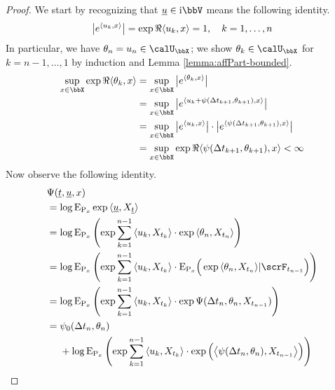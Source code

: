 \begin{proof}
  \label{proof:proposition:aff-fdds-complex}
  We start by recognizing that $\underline\momentVar \in \im\vecSpace$ means the following identity.
  \begin{equation*}
    \big| e^{\langle u_k , x \rangle} \big| = \exp\Re{\langle u_k , x\rangle} = 1, \quad k = 1, \ldots, n
  \end{equation*}
  In particular, we have $\twistVar_n = \momentVar_n \in \boundedSpace$; we show $\twistVar_k \in \boundedSpace$ for $k = n-1,\ldots, 1$ by induction and Lemma \ref{lemma:affPart-bounded}.
  \begin{align*}
    \sup_{\stateVar\in\stateSpace}\exp\Re\prj{\twistVar_k}{\stateVar} 
    &= \sup_{\stateVar\in\stateSpace}\big| e^\prj{\twistVar_k}{\stateVar} \big|  \\
    &= \sup_{\stateVar\in\stateSpace}\big| e^\prj{\momentVar_k + \affPart(\Delta t_{k+1}, \twistVar_{k+1})}{\stateVar} \big| \\
    &= \sup_{\stateVar\in\stateSpace}\big| e^\prj{\momentVar_k}{\stateVar} \big| \cdot \big| e^\prj{\affPart(\Delta t_{k+1}, \twistVar_{k+1})}{\stateVar} \big| \\
    &= \sup_{\stateVar\in\stateSpace} \exp\Re\prj{\affPart(\Delta t_{k+1}, \twistVar_{k+1})}{\stateVar} < \infty
  \end{align*}
  Now observe the following identity.
  \begin{align}
    \notag
    &\aff(\underline t, \underline\momentVar, \stateVar) \\
    \notag
    &=\log\Exp_{\Prb_\stateVar} \exp\prj{\underline\momentVar}{\X_{\underline t}} \\
    \label{eq:complex-tower-start}
    &= \log\Exp_{\Prb_\stateVar}\left( \exp\sum_{k=1}^{n-1} \prj{\momentVar_k}{\X_{t_k}} \cdot \exp\prj{\twistVar_n}{\X_{t_n}} \right) \\
    \notag
    &= \log\Exp_{\Prb_\stateVar}\left( \exp\sum_{k=1}^{n-1} \prj{\momentVar_k}{\X_{t_k}} \cdot \Exp_{\Prb_\stateVar}\Big(\exp\prj{\twistVar_n}{\X_{t_n}} |\scrF_{t_{n-1}} \Big) \right) \\
    \notag
    &= \log\Exp_{\Prb_\stateVar}\left( \exp\sum_{k=1}^{n-1} \prj{\momentVar_k}{\X_{t_k}} \cdot \exp\aff(\Delta t_n, \twistVar_n, \X_{t_{n-1}})\right) \\
    \notag
    &= \begin{aligned}[t]
      &\affPart_0(\Delta t_n, \twistVar_n) \\
      &+ \log\Exp_{\Prb_\stateVar}\left( \exp\sum_{k=1}^{n-1} \prj{\momentVar_k}{\X_{t_k}} \cdot \exp\Big( \bprj{\affPart(\Delta t_n, \twistVar_n)}{\X_{t_{n-1}}} \Big)   \right) 

\end{aligned}
\end{align}
\end{proof}
